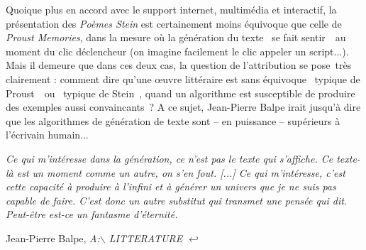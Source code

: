 \documentclass{article}
\newenvironment{citationbox}
{\begin{center}
		\begin{minipage}{.8\textwidth}
		}
		{
		\end{minipage}	
\end{center}
}
\begin{document}
				
				Quoique plus en accord avec le support internet, multimédia et interactif, la présentation des \textit{Poèmes Stein} est certainement moins équivoque que celle de \textit{Proust Memories}, dans la mesure où la génération du texte \guillemotleft~se fait sentir~\guillemotright~au moment du clic déclencheur (on imagine facilement le clic appeler un script...).\\
				
				Mais il demeure que dans ces deux cas, la question de l'attribution se pose très clairement : comment dire qu'une œuvre littéraire est sans équivoque \guillemotleft~typique de Proust~\guillemotright~ou \guillemotleft~typique de Stein~\guillemotright, quand un algorithme est susceptible de produire des exemples aussi convaincants ? A ce sujet, Jean-Pierre Balpe irait jusqu'à dire que les algorithmes de génération de texte sont -- en puissance -- supérieurs à l'écrivain humain...
				\begin{citationbox}
					\textit{Ce qui m’intéresse dans la génération, ce n’est pas le texte qui s’affiche. Ce texte-là est
				un moment comme un autre, on s’en fout. [...] Ce qui m’intéresse, c’est cette capacité à
				produire à l’infini et à générer un univers que je ne suis pas capable de faire. C’est donc un
				autre substitut qui transmet une pensée qui dit. Peut-être est-ce un fantasme d’éternité.}
					\begin{flushright}
						Jean-Pierre Balpe, \textit{A:{$\backslash$ LITTERATURE $\hookleftarrow$}}\autocite{balpebootz1994}
					\end{flushright}
				\end{citationbox}

				
\end{document}
